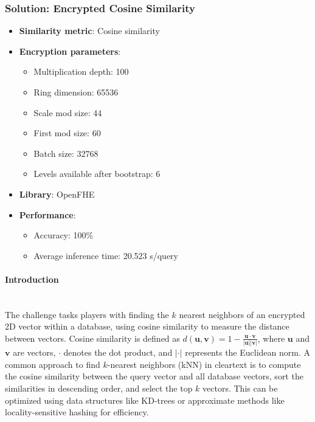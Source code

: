 \documentclass[article]{iacrtrans}
\begin{document}
\subsubsection{Solution: Encrypted Cosine Similarity}

\begin{itemize}
    \item \textbf{Similarity metric}: Cosine similarity
    \item \textbf{Encryption parameters}: 
        \begin{itemize}
            \item Multiplication depth: 100
            \item Ring dimension: 65536
            \item Scale mod size: 44
            \item First mod size: 60
            \item Batch size: 32768
            \item Levels available after bootstrap: 6
        \end{itemize}
    \item \textbf{Library}: OpenFHE \cite{OpenFHE}
    \item \textbf{Performance}: 
        \begin{itemize}
            \item Accuracy: 100\%
            \item Average inference time: 20.523 s/query
        \end{itemize}
\end{itemize}

\paragraph{Introduction}\mbox{}\\

The challenge tasks players with finding the $k$ nearest neighbors of an encrypted 2D vector within a database, using cosine similarity to measure the distance between vectors. Cosine similarity is defined as $d(\mathbf{u}, \mathbf{v}) = 1 - \frac{\mathbf{u} \cdot \mathbf{v}}{|\mathbf{u}| |\mathbf{v}|}$, where $\mathbf{u}$ and $\mathbf{v}$ are vectors, $\cdot$ denotes the dot product, and $|\cdot|$ represents the Euclidean norm. A common approach to find $k$-nearest neighbors (kNN) in cleartext is to compute the cosine similarity between the query vector and all database vectors, sort the similarities in descending order, and select the top $k$ vectors. This can be optimized using data structures like KD-trees or approximate methods like locality-sensitive hashing for efficiency.
\end{document}

